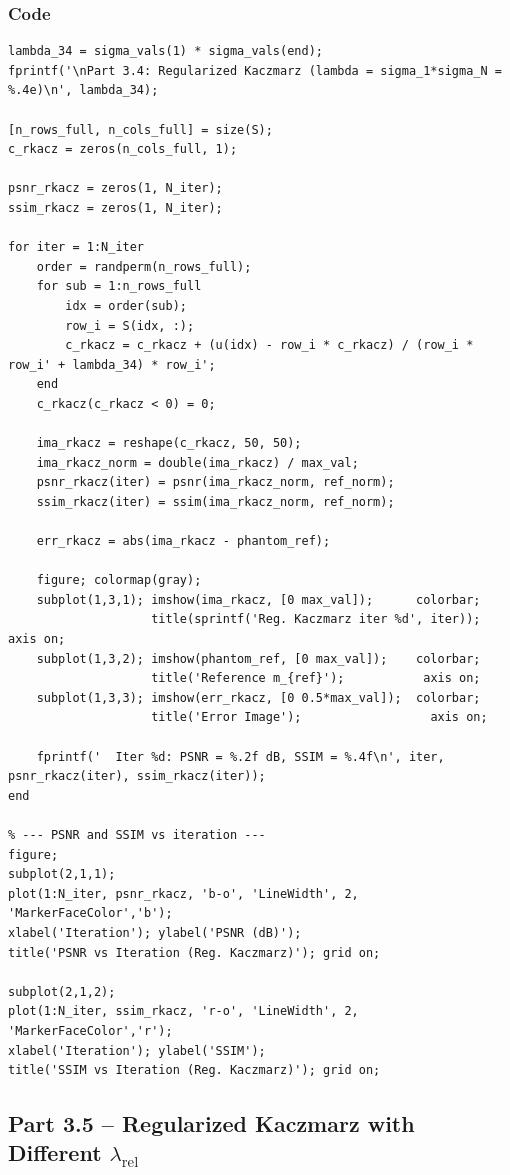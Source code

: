 \documentclass[12pt,a4paper]{article}
\begin{document}
\subsubsection*{Code}
\begin{lstlisting}
lambda_34 = sigma_vals(1) * sigma_vals(end);
fprintf('\nPart 3.4: Regularized Kaczmarz (lambda = sigma_1*sigma_N = %.4e)\n', lambda_34);

[n_rows_full, n_cols_full] = size(S);
c_rkacz = zeros(n_cols_full, 1);

psnr_rkacz = zeros(1, N_iter);
ssim_rkacz = zeros(1, N_iter);

for iter = 1:N_iter
    order = randperm(n_rows_full);
    for sub = 1:n_rows_full
        idx = order(sub);
        row_i = S(idx, :);
        c_rkacz = c_rkacz + (u(idx) - row_i * c_rkacz) / (row_i * row_i' + lambda_34) * row_i';
    end
    c_rkacz(c_rkacz < 0) = 0;

    ima_rkacz = reshape(c_rkacz, 50, 50);
    ima_rkacz_norm = double(ima_rkacz) / max_val;
    psnr_rkacz(iter) = psnr(ima_rkacz_norm, ref_norm);
    ssim_rkacz(iter) = ssim(ima_rkacz_norm, ref_norm);

    err_rkacz = abs(ima_rkacz - phantom_ref);

    figure; colormap(gray);
    subplot(1,3,1); imshow(ima_rkacz, [0 max_val]);      colorbar;
                    title(sprintf('Reg. Kaczmarz iter %d', iter)); axis on;
    subplot(1,3,2); imshow(phantom_ref, [0 max_val]);    colorbar;
                    title('Reference m_{ref}');           axis on;
    subplot(1,3,3); imshow(err_rkacz, [0 0.5*max_val]);  colorbar;
                    title('Error Image');                  axis on;

    fprintf('  Iter %d: PSNR = %.2f dB, SSIM = %.4f\n', iter, psnr_rkacz(iter), ssim_rkacz(iter));
end

% --- PSNR and SSIM vs iteration ---
figure;
subplot(2,1,1);
plot(1:N_iter, psnr_rkacz, 'b-o', 'LineWidth', 2, 'MarkerFaceColor','b');
xlabel('Iteration'); ylabel('PSNR (dB)');
title('PSNR vs Iteration (Reg. Kaczmarz)'); grid on;

subplot(2,1,2);
plot(1:N_iter, ssim_rkacz, 'r-o', 'LineWidth', 2, 'MarkerFaceColor','r');
xlabel('Iteration'); ylabel('SSIM');
title('SSIM vs Iteration (Reg. Kaczmarz)'); grid on;
\end{lstlisting}

\subsection{Part 3.5 -- Regularized Kaczmarz with Different $\lambda_\mathrm{rel}$}
\end{document}
